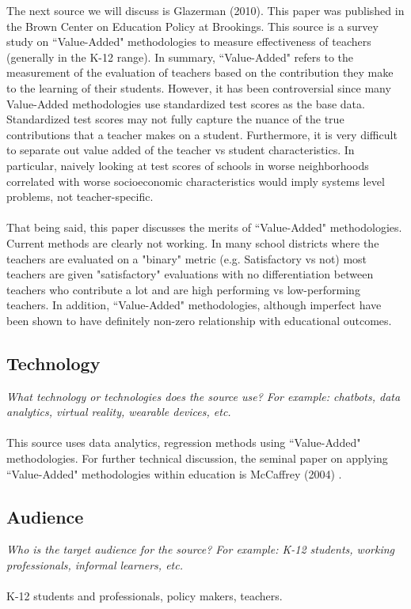 \documentclass[12pt, final]{article}
\begin{document}
The next source we will discuss is Glazerman (2010). This paper was published in the Brown Center on Education Policy at Brookings. This source is a survey study on ``Value-Added" methodologies to measure effectiveness of teachers (generally in the K-12 range). In summary, ``Value-Added" refers to the measurement of the evaluation of teachers based on the contribution they make to the learning of their students. However, it has been controversial since many Value-Added methodologies use standardized test scores as the base data. Standardized test scores may not fully capture the nuance of the true contributions that a teacher makes on a student. Furthermore, it is very difficult to separate out value added of the teacher vs student characteristics. In particular, naively looking at test scores of schools in worse neighborhoods correlated with worse socioeconomic characteristics would imply systems level problems, not teacher-specific.
\\
\\
That being said, this paper discusses the merits of ``Value-Added" methodologies. Current methods are clearly not working. In many school districts where the teachers are evaluated on a "binary" metric (e.g. Satisfactory vs not) most teachers are given "satisfactory" evaluations with no differentiation between teachers who contribute a lot and are high performing vs low-performing teachers. In addition, ``Value-Added" methodologies, although imperfect have been shown to have definitely non-zero relationship with educational outcomes. 

\subsection{Technology}
\textit{What technology or technologies does the source use? For example: chatbots, data analytics, virtual reality, wearable devices, etc.}
\\
\\
This source uses data analytics, regression methods using ``Value-Added" methodologies. For further technical discussion, the seminal paper on applying ``Value-Added" methodologies within education is McCaffrey (2004) \cite{McCaffrey}.

\subsection{Audience}
\textit{Who is the target audience for the source? For example: K-12 students, working professionals, informal learners, etc.}
\\
\\
K-12 students and professionals, policy makers, teachers.
\end{document}
